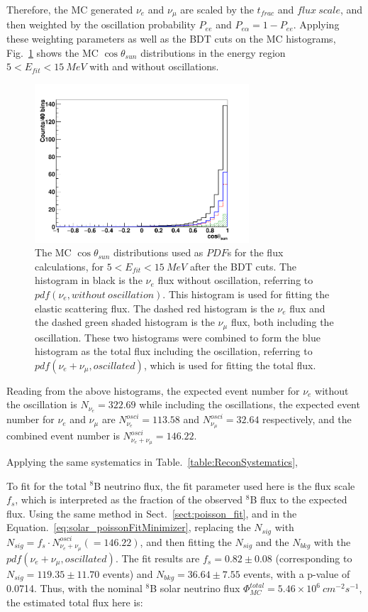 Therefore, the MC generated $\nu_e$ and $\nu_\mu$ are scaled by the $t_{frac}$ and $flux~scale$, and then weighted by the oscillation probability $P_{ee}$ and $P_{e\alpha}=1-P_{ee}$. Applying these weighting parameters as well as the BDT cuts on the MC histograms, Fig.~\ref{fig:MCfluxPdfs} shows the MC $\cos\theta_{sun}$ distributions in the energy region $5<E_{fit}<15~MeV$ with and without oscillations.

\begin{figure}[!htb]
	\centering
	\includegraphics[width=8cm]{MCfluxPdfs.png}
	\caption{The MC $\cos\theta_{sun}$ distributions used as $PDF$s for the flux calculations, for $5<E_{fit}<15~MeV$ after the BDT cuts. The histogram in black is the $\nu_e$ flux without oscillation, referring to $pdf(\nu_e,without~oscillation)$. This histogram is used for fitting the elastic scattering flux. The dashed red histogram is the $\nu_e$ flux and the dashed green shaded histogram is the $\nu_\mu$ flux, both including the oscillation. These two histograms were combined to form the blue histogram as the total flux including the oscillation, referring to $pdf(\nu_e+\nu_\mu,oscillated)$, which is used for fitting the total flux.}
	\label{fig:MCfluxPdfs}
\end{figure} 

Reading from the above histograms, the expected event number for $\nu_e$ without the oscillation is $N_{\nu_e} = 322.69$ while including the oscillations, the expected event number for $\nu_e$ and $\nu_\mu$ are $N^{osci}_{\nu_e} = 113.58$ and $N^{osci}_{\nu_\mu} = 32.64$ respectively, and the combined event number is $N^{osci}_{\nu_e+\nu_\mu}=146.22$.

Applying the same systematics in Table.~\ref{table:ReconSystematics},  





To fit for the total $^8$B neutrino flux, the fit parameter used here is the flux scale $f_s$, which is interpreted as the fraction of the observed $^8$B flux to the expected flux. Using the same method in Sect.~\ref{sect:poisson_fit}, and in the Equation.~\ref{eq:solar_poissonFitMinimizer}, replacing the $N_{sig}$ with $N_{sig}=f_s\cdot N^{osci}_{\nu_e+\nu_\mu}(=146.22)$, and then fitting the $N_{sig}$ and the $N_{bkg}$ with the $pdf(\nu_e+\nu_\mu,oscillated)$. The fit results are $f_s=0.82\pm 0.08$ (corresponding to $N_{sig}=119.35\pm11.70$  events) and $N_{bkg}=36.64\pm7.55$ events, with a p-value of 0.0714. Thus, with the nominal $^8$B solar neutrino flux $\Phi^{total}_{MC}=5.46\times 10^6~cm^{-2}s^{-1}$, the estimated total flux here is:

